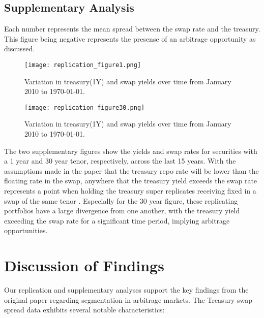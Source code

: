 \documentclass[12pt]{article}
\begin{document}
\subsection{Supplementary Analysis}

\begin{table}
    \centering
    
    \caption{Each number represents the mean spread between the swap rate and the treasury. This figure being negative represents the presense of an arbitrage opportunity as discussed.}
\end{table}

\begin{figure}[H]
    \centering
    \texttt{[image: replication\_figure1.png]}
    \caption{Variation in treasury(1Y) and swap yields over time from January 2010 to \today.}
    \label{fig:treasury_swap_spreads_supplementary1}
\end{figure}

\begin{figure}[H]
    \centering
    \texttt{[image: replication\_figure30.png]}
    \caption{Variation in treasury(1Y) and swap yields over time from January 2010 to \today.}
    \label{fig:treasury_swap_spreads_supplementary30}
\end{figure}

The two supplementary figures show the yields and swap rates for securities with a 1 year and 30 year tenor, respectively, across the last 15 years. With the assumptions made in the paper that the treasury repo rate will be lower than the floating rate in the swap, anywhere that the treasury yield exceeds the swap rate represents a point when holding the treasury super replicates receiving fixed in a swap of the same tenor \citet{NBERw30561}. Especially for the 30 year figure, these replicating portfolios have a large divergence from one another, with the treasury yield exceeding the swap rate for a significant time period, implying arbitrage opportunities.

\section{Discussion of Findings}

Our replication and supplementary analyses support the key findings from the original paper regarding segmentation in arbitrage markets. The Treasury swap spread data exhibits several notable characteristics:
\end{document}
